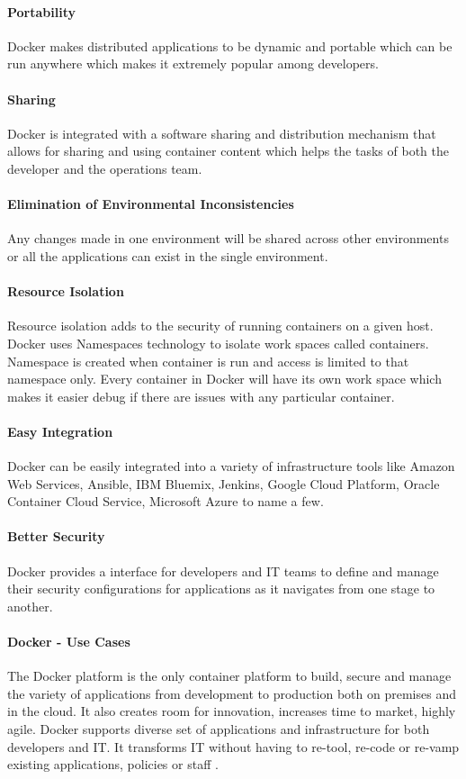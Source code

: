 \documentclass[sigconf]{acmart}
\begin{document}
	\paragraph{Portability}
	Docker makes distributed applications to be dynamic and portable which can be run anywhere which makes it extremely popular among developers.
	\paragraph{Sharing}
	Docker is integrated with a software sharing and distribution mechanism that allows for sharing and using container content which helps the tasks of both the developer and the operations team.
	\paragraph{Elimination of Environmental Inconsistencies}
	Any changes made in one environment will be shared across other environments or all the applications can exist in the single environment.
	\paragraph{Resource Isolation}
	Resource isolation adds to the security of running containers on a given host. Docker uses Namespaces technology to isolate work spaces called containers. Namespace is created when container is run and access is limited to that namespace only. Every container in Docker will have its own work space which makes it easier debug if there are issues with any particular container.
	\paragraph{Easy Integration}
	Docker can be easily integrated into a variety of infrastructure tools like Amazon Web Services, Ansible, IBM Bluemix, Jenkins, Google Cloud Platform, Oracle Container Cloud Service, Microsoft Azure to name a few.
	\paragraph{Better Security}
	Docker provides a interface for developers and IT teams to define and manage their security configurations for applications as it navigates from one stage to another.
	
	\paragraph{Docker - Use Cases}
	The Docker platform is the only container platform to build, secure and manage the variety of applications from development to production both on premises and in the cloud. It also creates room for innovation, increases time to market, highly agile. Docker supports diverse set of applications and infrastructure for both developers and IT. It transforms IT without having to re-tool, re-code or re-vamp existing applications, policies or staff \cite{hackernoon}.
\end{document}
